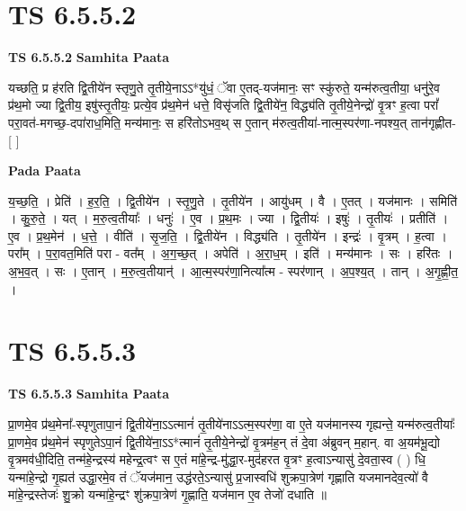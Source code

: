\documentclass[17pt]{extarticle}
\begin{document}
\section*{ TS 6.5.5.2 }

\textbf{TS 6.5.5.2 } \newline
\textbf{Samhita Paata} \newline

यच्छति॒ प्र ह॑रति द्वि॒तीये॑न स्तृणु॒ते तृ॒तीये॒नाऽऽ*यु॑धं॒ ॅवा ए॒तद्-यज॑मानः॒ सꣳ स्कु॑रुते॒ यन्म॑रुत्व॒तीया॒ धनु॑रे॒व प्र॑थ॒मो ज्या द्वि॒तीय॒ इषु॑स्तृ॒तीयः॒ प्रत्ये॒व प्र॑थ॒मेन॑ धत्ते॒ विसृ॑जति द्वि॒तीये॑न॒ विद्ध्य॑ति तृ॒तीये॒नेन्द्रो॑ वृ॒त्रꣳ ह॒त्वा परां᳚ परा॒वत॑-मगच्छ॒-दपा॑राध॒मिति॒ मन्य॑मानः॒ स हरि॑तोऽभव॒थ् स ए॒तान् म॑रुत्व॒तीया॑-नात्म॒स्पर॑णा-नपश्य॒त् तान॑गृह्णीत- [  ] \newline

\textbf{Pada Paata} \newline

य॒च्छ॒ति॒ । प्रेति॑ । ह॒र॒ति॒ । द्वि॒तीये॑न । स्तृ॒णु॒ते । तृ॒तीये॑न । आयु॑धम् । वै । ए॒तत् । यज॑मानः । समिति॑ । कु॒रु॒ते॒ । यत् । म॒रु॒त्व॒तीयाः᳚ । धनुः॑ । ए॒व । प्र॒थ॒मः । ज्या । द्वि॒तीयः॑ । इषुः॑ । तृ॒तीयः॑ । प्रतीति॑ । ए॒व । प्र॒थ॒मेन॑ । ध॒त्ते॒ । वीति॑ । सृ॒ज॒ति॒ । द्वि॒तीये॑न । विद्ध्य॑ति । तृ॒तीये॑न । इन्द्रः॑ । वृ॒त्रम् । ह॒त्वा । परा᳚म् । प॒रा॒वत॒मिति॑ परा - वत᳚म् । अ॒ग॒च्छ॒त् । अपेति॑ । अ॒रा॒ध॒म् । इति॑ । मन्य॑मानः । सः । हरि॑तः । अ॒भ॒व॒त् । सः । ए॒तान् । म॒रु॒त्व॒तीयान्॑ । आ॒त्म॒स्पर॑णा॒नित्या᳚त्म - स्पर॑णान् । अ॒प॒श्य॒त् । तान् । अ॒गृ॒ह्णी॒त॒ ।  \newline




\section*{ TS 6.5.5.3 }

\textbf{TS 6.5.5.3 } \newline
\textbf{Samhita Paata} \newline

प्रा॒णमे॒व प्र॑थ॒मेना᳚-स्पृणुतापा॒नं द्वि॒तीये॑ना॒ऽऽत्मानं॑ तृ॒तीये॑नाऽऽत्म॒स्पर॑णा॒ वा ए॒ते यज॑मानस्य गृह्यन्ते॒ यन्म॑रुत्व॒तीयाः᳚ प्रा॒णमे॒व प्र॑थ॒मेन॑ स्पृणुतेऽपा॒नं द्वि॒तीये॑ना॒ऽऽ*त्मानं॑ तृ॒तीये॒नेन्द्रो॑ वृ॒त्रम॑ह॒न् तं दे॒वा अ॑ब्रुवन् म॒हान्. वा अ॒यम॑भू॒द्यो वृ॒त्रमव॑धी॒दिति॒ तन्म॑हे॒न्द्रस्य॑ महेन्द्र॒त्वꣳ स ए॒तं मा॑हे॒न्द्र-मु॑द्धा॒र-मुद॑हरत वृ॒त्रꣳ ह॒त्वाऽन्यासु॑ दे॒वता॒स्व ( ) धि॒ यन्मा॑हे॒न्द्रो गृ॒ह्यत॑ उद्धा॒रमे॒व तं ॅयज॑मान॒ उद्ध॑रते॒ऽन्यासु॑ प्र॒जास्वधि॑ शुक्रपा॒त्रेण॑ गृह्णाति यजमानदेव॒त्यो॑ वै मा॑हे॒न्द्रस्तेजः॑ शु॒क्रो यन्मा॑हे॒न्द्रꣳ शु॑क्रपा॒त्रेण॑ गृ॒ह्णाति॒ यज॑मान ए॒व तेजो॑ दधाति ॥ \newline
\end{document}
